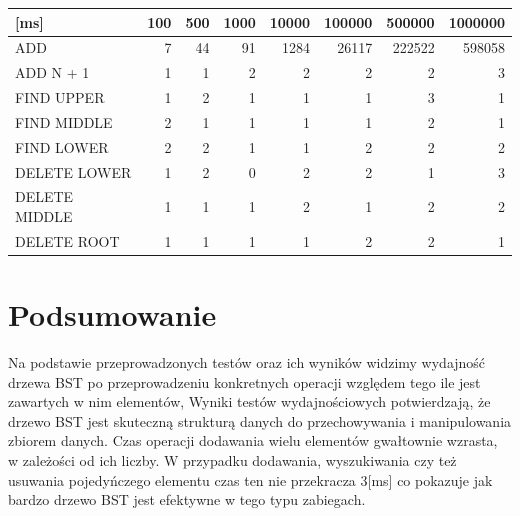 \documentclass{article}
\begin{document}
\begin{table}[H]
    \begin{tabular}{|l|r|r|r|r|r|r|r|}
    \hline
    {[}ms{]}      & 100 & 500 & 1000 & 10000 & 100000 & 500000 & 1000000 \\ \hline
    ADD           & 7   & 44  & 91   & 1284  & 26117  & 222522 & 598058  \\ \hline
    ADD N + 1     & 1   & 1   & 2    & 2     & 2      & 2      & 3       \\ \hline
    FIND UPPER    & 1   & 2   & 1    & 1     & 1      & 3      & 1       \\ \hline
    FIND MIDDLE   & 2   & 1   & 1    & 1     & 1      & 2      & 1       \\ \hline
    FIND LOWER    & 2   & 2   & 1    & 1     & 2      & 2      & 2       \\ \hline
    DELETE LOWER  & 1   & 2   & 0    & 2     & 2      & 1      & 3       \\ \hline
    DELETE MIDDLE & 1   & 1   & 1    & 2     & 1      & 2      & 2       \\ \hline
    DELETE ROOT   & 1   & 1   & 1    & 1     & 2      & 2      & 1       \\ \hline
    \end{tabular}
    \end{table}

\section*{Podsumowanie}
Na podstawie przeprowadzonych testów oraz ich wyników widzimy wydajność drzewa BST po przeprowadzeniu konkretnych operacji względem tego ile jest zawartych w nim elementów, Wyniki testów wydajnościowych potwierdzają, że drzewo BST jest skuteczną strukturą danych do przechowywania i manipulowania zbiorem danych. Czas operacji dodawania wielu elementów gwałtownie wzrasta, w zależości od ich liczby. W przypadku dodawania, wyszukiwania czy też usuwania pojedyńczego elementu czas ten nie przekracza 3[ms] co pokazuje jak bardzo drzewo BST jest efektywne w tego typu zabiegach. 
\end{document}
